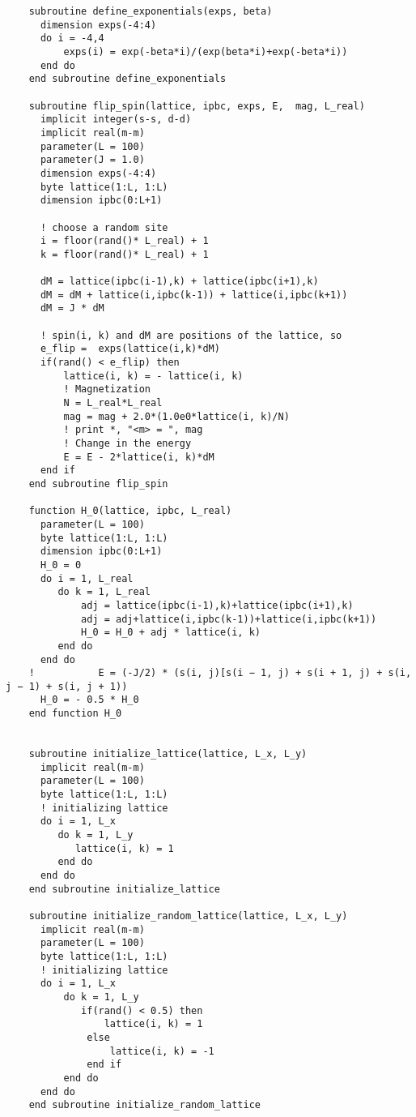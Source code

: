 

\begin{verbatim}
    subroutine define_exponentials(exps, beta)
      dimension exps(-4:4)
      do i = -4,4
          exps(i) = exp(-beta*i)/(exp(beta*i)+exp(-beta*i)) 
      end do
    end subroutine define_exponentials
      
    subroutine flip_spin(lattice, ipbc, exps, E,  mag, L_real)
      implicit integer(s-s, d-d)
      implicit real(m-m)
      parameter(L = 100)
      parameter(J = 1.0)
      dimension exps(-4:4)
      byte lattice(1:L, 1:L)
      dimension ipbc(0:L+1)
    
      ! choose a random site
      i = floor(rand()* L_real) + 1
      k = floor(rand()* L_real) + 1
    
      dM = lattice(ipbc(i-1),k) + lattice(ipbc(i+1),k)
      dM = dM + lattice(i,ipbc(k-1)) + lattice(i,ipbc(k+1))
      dM = J * dM
    
      ! spin(i, k) and dM are positions of the lattice, so
      e_flip =  exps(lattice(i,k)*dM)
      if(rand() < e_flip) then 
          lattice(i, k) = - lattice(i, k)           
          ! Magnetization
          N = L_real*L_real
          mag = mag + 2.0*(1.0e0*lattice(i, k)/N)
          ! print *, "<m> = ", mag 
          ! Change in the energy
          E = E - 2*lattice(i, k)*dM
      end if  
    end subroutine flip_spin
    
    function H_0(lattice, ipbc, L_real)
      parameter(L = 100)
      byte lattice(1:L, 1:L)
      dimension ipbc(0:L+1)
      H_0 = 0
      do i = 1, L_real
         do k = 1, L_real
             adj = lattice(ipbc(i-1),k)+lattice(ipbc(i+1),k)
             adj = adj+lattice(i,ipbc(k-1))+lattice(i,ipbc(k+1))
             H_0 = H_0 + adj * lattice(i, k)
         end do
      end do
    !           E = (-J/2) * (s(i, j)[s(i − 1, j) + s(i + 1, j) + s(i, j − 1) + s(i, j + 1))
      H_0 = - 0.5 * H_0
    end function H_0
      
      
    subroutine initialize_lattice(lattice, L_x, L_y)
      implicit real(m-m)
      parameter(L = 100)
      byte lattice(1:L, 1:L)
      ! initializing lattice
      do i = 1, L_x
         do k = 1, L_y
            lattice(i, k) = 1
         end do
      end do
    end subroutine initialize_lattice
      
    subroutine initialize_random_lattice(lattice, L_x, L_y)
      implicit real(m-m)
      parameter(L = 100)
      byte lattice(1:L, 1:L)
      ! initializing lattice
      do i = 1, L_x
          do k = 1, L_y
             if(rand() < 0.5) then 
                 lattice(i, k) = 1
              else 
                  lattice(i, k) = -1
              end if
          end do
      end do
    end subroutine initialize_random_lattice
      

\end{verbatim}
